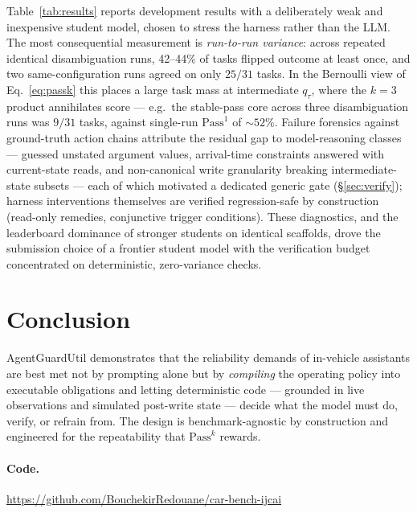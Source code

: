 \documentclass{article}
\newcommand{\pass}[1]{\ensuremath{\mathrm{Pass}^{#1}}}
\begin{document}
Table~\ref{tab:results} reports development results with a deliberately weak
and inexpensive student model, chosen to stress the harness rather than the
LLM. The most consequential measurement is \emph{run-to-run variance}: across
repeated identical disambiguation runs, 42--44\% of tasks flipped outcome at
least once, and two same-configuration runs agreed on only $25/31$ tasks. In
the Bernoulli view of Eq.~\eqref{eq:passk} this places a large task mass at
intermediate $q_\tau$, where the $k{=}3$ product annihilates score --- e.g.\
the stable-pass core across three disambiguation runs was $9/31$ tasks,
against single-run $\pass{1}$ of ${\sim}52\%$. Failure forensics against
ground-truth action chains attribute the residual gap to model-reasoning
classes --- guessed unstated argument values, arrival-time constraints
answered with current-state reads, and non-canonical write granularity
breaking intermediate-state subsets --- each of which motivated a dedicated
generic gate (\S\ref{sec:verify}); harness interventions themselves are
verified regression-safe by construction (read-only remedies, conjunctive
trigger conditions). These diagnostics, and the leaderboard dominance of
stronger students on identical scaffolds, drove the submission choice of a
frontier student model with the verification budget concentrated on
deterministic, zero-variance checks.

\section{Conclusion}
AgentGuardUtil demonstrates that the reliability demands of in-vehicle
assistants are best met not by prompting alone but by \emph{compiling} the
operating policy into executable obligations and letting deterministic code
--- grounded in live observations and simulated post-write state --- decide
what the model must do, verify, or refrain from. The design is
benchmark-agnostic by construction and engineered for the repeatability that
$\pass{k}$ rewards.

\paragraph{Code.} \url{https://github.com/BouchekirRedouane/car-bench-ijcai}
\end{document}
